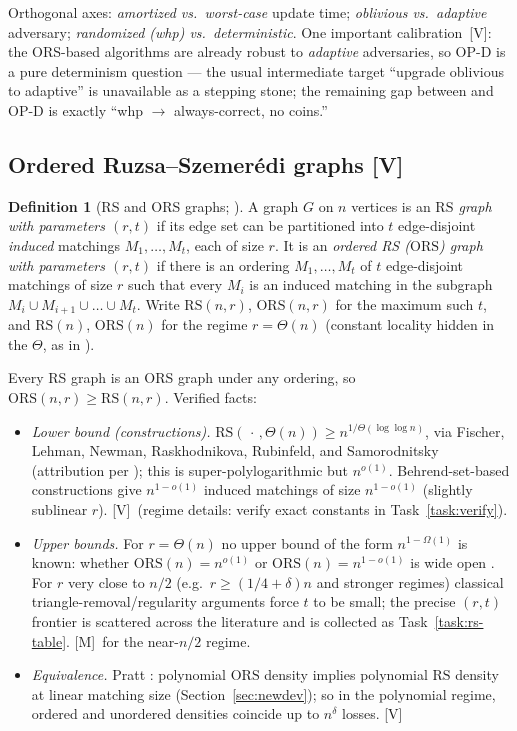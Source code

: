 \documentclass[11pt]{article}
\theoremstyle{definition}
\newtheorem{definition}[theorem]{Definition}
\theoremstyle{remark}
\newcommand{\statusV}{\textcolor{green!45!black}{\textsf{[V]}}}
\newcommand{\statusM}{\textcolor{orange!80!black}{\textsf{[M]}}}
\newcommand{\ORS}{\mathrm{ORS}}
\newcommand{\RS}{\mathrm{RS}}
\begin{document}
Orthogonal axes: \emph{amortized vs.\ worst-case} update time;
\emph{oblivious vs.\ adaptive} adversary; \emph{randomized (whp) vs.\
deterministic}. One important calibration~\statusV: the ORS-based
algorithms \cite{BG24,AKK25} are already robust to \emph{adaptive}
adversaries, so OP-D is a pure determinism question --- the usual
intermediate target ``upgrade oblivious to adaptive'' is unavailable as a
stepping stone; the remaining gap between \cite{AKK25} and OP-D is
exactly ``whp $\to$ always-correct, no coins.''

\subsection{Ordered Ruzsa--Szemer\'edi graphs \statusV}
\label{sec:ors}

\begin{definition}[RS and ORS graphs; \cite{RS78,BG24}]
\label{def:ors}
A graph $G$ on $n$ vertices is an \emph{$\RS$ graph with parameters
$(r,t)$} if its edge set can be partitioned into $t$ edge-disjoint
\emph{induced} matchings $M_1,\dots,M_t$, each of size $r$. It is an
\emph{ordered RS ($\ORS$) graph with parameters $(r,t)$} if there is an
ordering $M_1,\dots,M_t$ of $t$ edge-disjoint matchings of size $r$ such
that every $M_i$ is an induced matching in the subgraph
$M_i\cup M_{i+1}\cup\dots\cup M_t$. Write $\RS(n,r)$, $\ORS(n,r)$ for the
maximum such $t$, and $\RS(n)$, $\ORS(n)$ for the regime $r=\Theta(n)$
(constant locality hidden in the $\Theta$, as in \cite{BG24}).
\end{definition}

Every RS graph is an ORS graph under any ordering, so
$\ORS(n,r)\ge\RS(n,r)$. Verified facts:

\begin{itemize}[itemsep=2pt]
\item \emph{Lower bound (constructions).} $\RS(\,\cdot\,,\Theta(n))\ge
n^{1/\Theta(\log\log n)}$, via Fischer, Lehman, Newman, Raskhodnikova,
Rubinfeld, and Samorodnitsky \cite{FLNRRS02} (attribution per \cite{BG24});
this is super-polylogarithmic but $n^{o(1)}$. Behrend-set-based
constructions \cite{Beh46,RS78} give $n^{1-o(1)}$ induced matchings of
size $n^{1-o(1)}$ (slightly sublinear $r$). \statusV\ (regime details:
verify exact constants in Task~\ref{task:verify}).
\item \emph{Upper bounds.} For $r=\Theta(n)$ no upper bound of the form
$n^{1-\Omega(1)}$ is known: whether $\ORS(n)=n^{o(1)}$ or
$\ORS(n)=n^{1-o(1)}$ is wide open \cite{BG24}. For $r$ very close to
$n/2$ (e.g.\ $r\ge(1/4+\delta)n$ and stronger regimes) classical
triangle-removal/regularity arguments force $t$ to be small;
the precise $(r,t)$ frontier is scattered across the literature and is
collected as Task~\ref{task:rs-table}. \statusM\ for the near-$n/2$
regime.
\item \emph{Equivalence.} Pratt \cite{Pra26}: polynomial $\ORS$ density
implies polynomial $\RS$ density at linear matching size
(Section~\ref{sec:newdev}); so in the polynomial regime, ordered and
unordered densities coincide up to $n^{\delta}$ losses. \statusV
\end{itemize}
\end{document}
